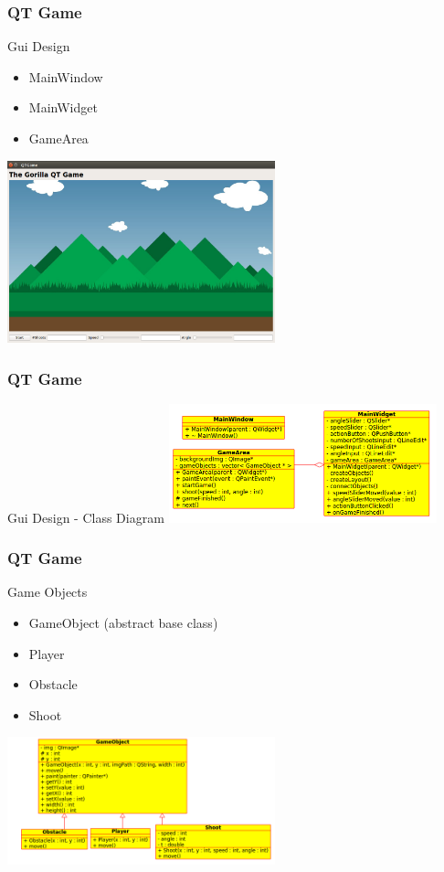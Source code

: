 \begin{frame}[fragile]
\frametitle{QT Game}
Gui Design
\begin{itemize}
\item MainWindow
\item MainWidget
\item GameArea
\end{itemize}
\includegraphics[width=220pt]{img/qtgamegui.png}
\end{frame}

\begin{frame}[fragile]
\frametitle{QT Game}
Gui Design - Class Diagram
\includegraphics[width=220pt]{img/qtgame_cdgui.png}
\end{frame}

\begin{frame}[fragile]
\frametitle{QT Game}
Game Objects
\begin{itemize}
\item GameObject (abstract base class)
\item Player
\item Obstacle
\item Shoot
\end{itemize}
\includegraphics[width=220pt]{img/qtgame_cdgo.png}
\end{frame}

